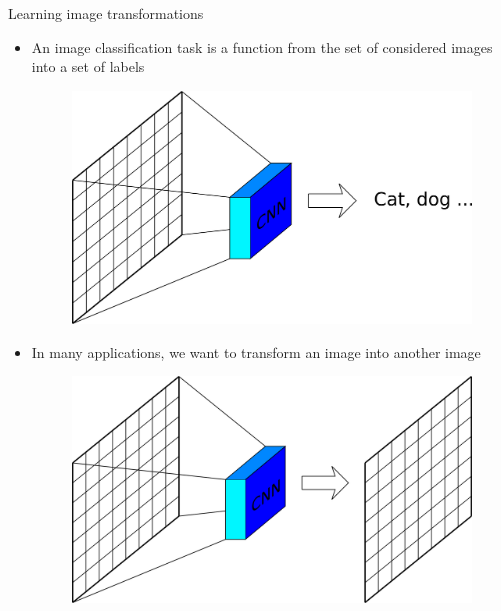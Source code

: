 \documentclass[xcolor=pdftex,dvipsnames,table,mathserif]{beamer}
\begin{document}
\begin{frame}{Learning image transformations}

  \begin{itemize}
  \item An image classification task is a function from the set of considered images into a set of labels
      \begin{figure}
      \includegraphics[width=0.40\textheight]{image_classif.png}
      \end{figure}
      \pause
  \item In many applications, we want to transform an image into another image
      \begin{figure}
      \includegraphics[width=0.40\textheight]{image_transf0.png}
      \end{figure}
  \end{itemize}

\end{frame}
\end{document}

